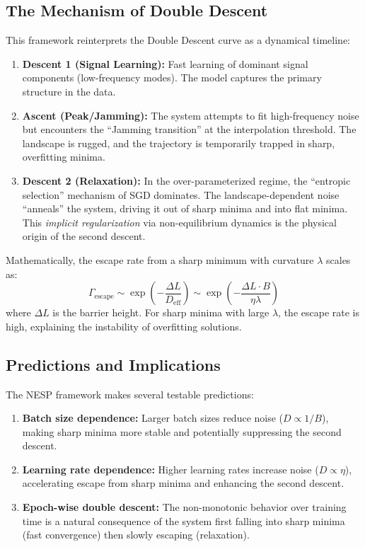 \documentclass[
  journal=largetwo,
  year=2025,
  volume=37,
]{cup-journal}
\begin{document}
\subsection{The Mechanism of Double Descent}

This framework reinterprets the Double Descent curve as a dynamical timeline:

\begin{enumerate}
    \item \textbf{Descent 1 (Signal Learning):} Fast learning of dominant signal components (low-frequency modes). The model captures the primary structure in the data.
    
    \item \textbf{Ascent (Peak/Jamming):} The system attempts to fit high-frequency noise but encounters the ``Jamming transition'' at the interpolation threshold. The landscape is rugged, and the trajectory is temporarily trapped in sharp, overfitting minima.
    
    \item \textbf{Descent 2 (Relaxation):} In the over-parameterized regime, the ``entropic selection'' mechanism of SGD dominates. The landscape-dependent noise ``anneals'' the system, driving it out of sharp minima and into flat minima. This \textit{implicit regularization} via non-equilibrium dynamics is the physical origin of the second descent.
\end{enumerate}

Mathematically, the escape rate from a sharp minimum with curvature $\lambda$ scales as:
\begin{equation}
    \Gamma_{\text{escape}} \sim \exp\left(-\frac{\Delta L}{D_{\text{eff}}}\right) \sim \exp\left(-\frac{\Delta L \cdot B}{\eta \lambda}\right)
\end{equation}
where $\Delta L$ is the barrier height. For sharp minima with large $\lambda$, the escape rate is high, explaining the instability of overfitting solutions.

\subsection{Predictions and Implications}

The NESP framework makes several testable predictions:

\begin{enumerate}
    \item \textbf{Batch size dependence:} Larger batch sizes reduce noise ($D \propto 1/B$), making sharp minima more stable and potentially suppressing the second descent.
    
    \item \textbf{Learning rate dependence:} Higher learning rates increase noise ($D \propto \eta$), accelerating escape from sharp minima and enhancing the second descent.
    
    \item \textbf{Epoch-wise double descent:} The non-monotonic behavior over training time is a natural consequence of the system first falling into sharp minima (fast convergence) then slowly escaping (relaxation).
\end{enumerate}
\end{document}
